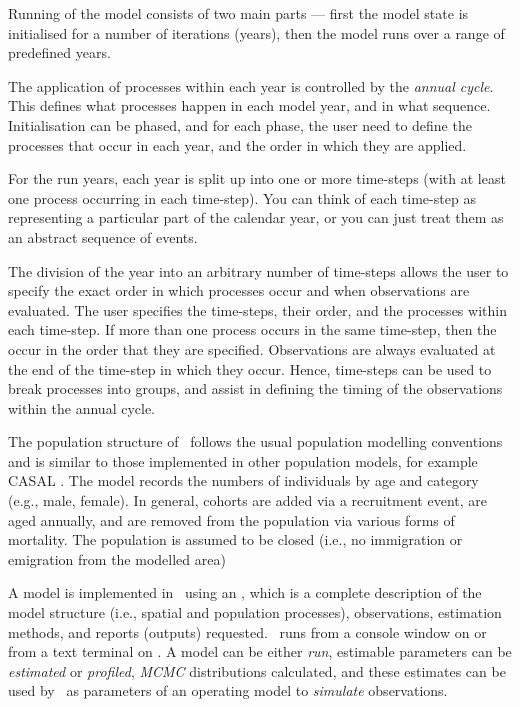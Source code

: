Running of the model consists of two main parts --- first the model state is initialised for a number of iterations (years), then the model runs over a range of predefined years. 

The application of processes within each year is controlled by the \emph{annual cycle}. This defines what processes happen in each model year, and in what sequence. Initialisation can be phased, and for each phase, the user need to define the processes that occur in each year, and the order in which they are applied. 

For the run years, each year is split up into one or more time-steps (with at least one process occurring in each time-step). You can think of each time-step as representing a particular part of the calendar year, or you can just treat them as an abstract sequence of events.

The division of the year into an arbitrary number of time-steps allows the user to specify the exact order in which processes occur and when observations are evaluated. The user specifies the time-steps, their order, and the processes within each time-step. If more than one process occurs in the same time-step, then the occur in the order that they are specified. Observations are always evaluated at the end of the time-step in which they occur. Hence, time-steps can be used to break processes into groups, and assist in defining the timing of the observations within the annual cycle. 

The population structure of \CNAME\ follows the usual population modelling conventions and is similar to those implemented in other population models, for example CASAL  \citep{1388}. The model records the numbers of individuals by age and category (e.g., male, female). In general, cohorts are added via a recruitment event, are aged annually, and are removed from the population via various forms of mortality. The population is assumed to be closed (i.e., no immigration or emigration from the modelled area)

A model is implemented in \CNAME\ using an \config {}, which is a complete description of the model structure (i.e., spatial and population processes), observations, estimation methods, and reports (outputs) requested. \CNAME\ runs from a console window on  or from a text terminal on . A model can be either \emph{run}, estimable parameters can be \emph{estimated} or \emph{profiled}, \emph{MCMC} distributions calculated, and these estimates can be %
used by \CNAME\ as parameters of an operating model to \emph{simulate} observations.

